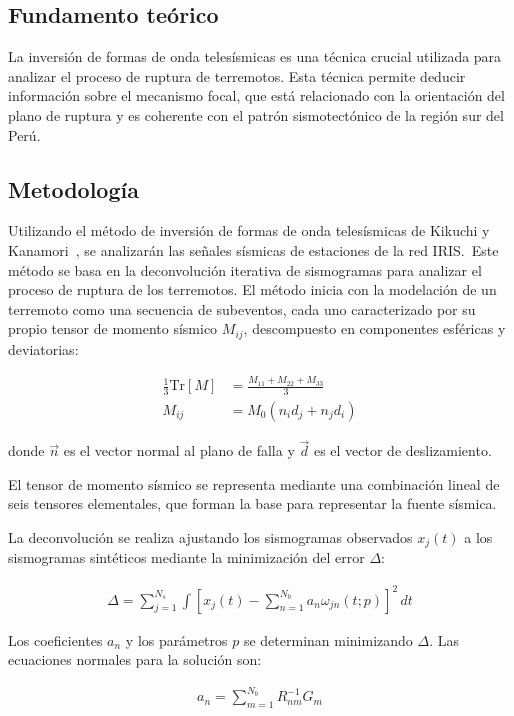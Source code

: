 \documentclass[a4paper,11pt]{article}
\begin{document}
\subsection{Fundamento teórico}

La inversión de formas de onda telesísmicas es una técnica crucial utilizada para analizar el proceso de ruptura de terremotos. Esta técnica permite deducir información sobre el mecanismo focal, que está relacionado con la orientación del plano de ruptura y es coherente con el patrón sismotectónico de la región sur del Perú.

\subsection{Metodología}
Utilizando el método de inversión de formas de onda telesísmicas de Kikuchi y Kanamori~\cite{Kik2003}, se analizarán las señales sísmicas de estaciones de la red IRIS.\ Este método se basa en la deconvolución iterativa de sismogramas para analizar el proceso de ruptura de los terremotos. El método inicia con la modelación de un terremoto como una secuencia de subeventos, cada uno caracterizado por su propio tensor de momento sísmico \( M_{ij} \), descompuesto en componentes esféricas y deviatorias:

\begin{align}
  \frac{1}{3} \text{Tr}[M] & = \frac{M_{11} + M_{22} + M_{33}}{3}\\
  M_{ij} &= M_0(n_i d_j + n_j d_i)
\end{align}

donde \( \vec{n} \) es el vector normal al plano de falla y \( \vec{d} \) es el vector de deslizamiento.

El tensor de momento sísmico se representa mediante una combinación lineal de seis tensores elementales, que forman la base para representar la fuente sísmica.

La deconvolución se realiza ajustando los sismogramas observados \( x_j(t) \) a los sismogramas sintéticos mediante la minimización del error \( \Delta \):

\begin{align}
    \Delta = \sum_{j=1}^{N_s} \int \left[ x_j(t) - \sum_{n=1}^{N_b} a_n \omega_{jn}(t; p) \right]^2 \, dt
\end{align}

Los coeficientes \( a_n \) y los parámetros \( p \) se determinan minimizando \( \Delta \). Las ecuaciones normales para la solución son:

\begin{align}
    a_n = \sum_{m=1}^{N_b} R_{nm}^{-1} G_m
\end{align}
\end{document}
